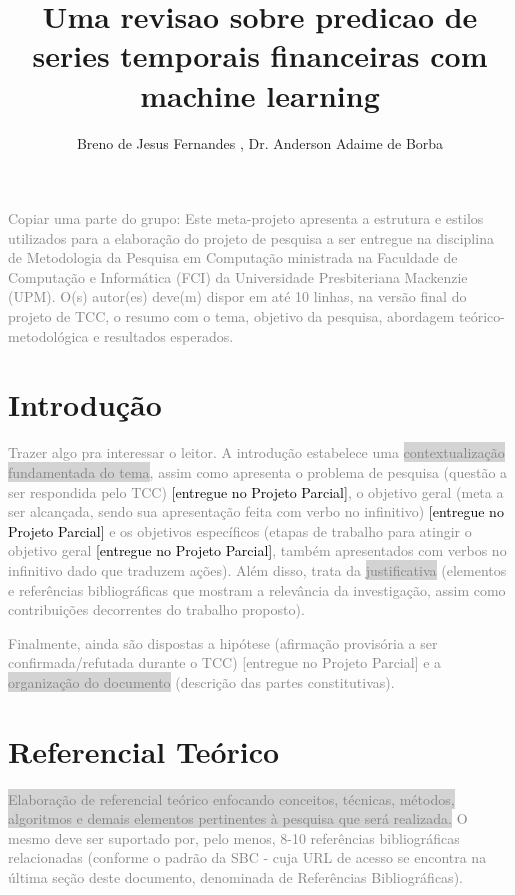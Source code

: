 \documentclass[12pt]{article}
\title{Uma revisao sobre predicao de series temporais financeiras com machine learning}
\author{Breno de Jesus Fernandes \inst{1}, Dr. Anderson Adaime de Borba\inst{1,2}}
\begin{document}
 

\maketitle

\begin{resumo} 
  \textcolor{gray}{Copiar uma parte do grupo: Este meta-projeto apresenta a estrutura e estilos utilizados para a elaboração do projeto de pesquisa a ser entregue na disciplina de Metodologia da Pesquisa em Computação ministrada na Faculdade de Computação e Informática (FCI) da Universidade Presbiteriana Mackenzie (UPM). O(s) autor(es) deve(m) dispor em até 10 linhas, na versão final do projeto de TCC, o resumo com o tema, objetivo da pesquisa, abordagem teórico-metodológica e resultados esperados.}
\end{resumo}

\section{Introdução}

\textcolor{gray}{Trazer algo pra interessar o leitor. A introdução estabelece uma \colorbox{lightgray}{contextualização fundamentada do tema}, assim como apresenta o problema de pesquisa (questão a ser respondida pelo TCC) \textcolor{black}{[entregue no Projeto Parcial]}, o objetivo geral (meta a ser alcançada, sendo sua apresentação feita com verbo no infinitivo) \textcolor{black}{[entregue no Projeto Parcial]} e os objetivos específicos (etapas de trabalho para atingir o objetivo geral \textcolor{black}{[entregue no Projeto Parcial]}, também apresentados com verbos no infinitivo dado que traduzem ações). Além disso, trata da \colorbox{lightgray}{justificativa} (elementos e referências bibliográficas que mostram a relevância da investigação, assim como contribuições decorrentes do trabalho proposto).}

\textcolor{gray}{Finalmente, ainda são dispostas a hipótese (afirmação provisória a ser confirmada/refutada durante o TCC) [entregue no Projeto Parcial] e a \colorbox{lightgray}{organização do documento} (descrição das partes constitutivas).}

\section{Referencial Teórico}
\textcolor{gray}{\colorbox{lightgray}{Elaboração de referencial teórico enfocando conceitos, técnicas, métodos, algoritmos e }
\colorbox{lightgray}{demais elementos pertinentes à pesquisa que será realizada.} O mesmo deve ser suportado por, pelo menos, 8-10 referências bibliográficas relacionadas (conforme o padrão da SBC - cuja URL de acesso se encontra na última seção deste documento, denominada de Referências Bibliográficas).}
\end{document}
